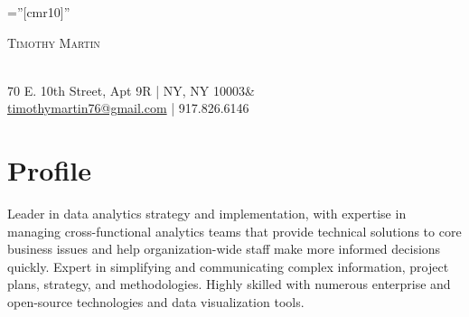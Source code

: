 \documentclass[a4paper,10pt]{article}
\begin{document}
\pagestyle{empty} %
\font\fb=''[cmr10]'' %


\par{\centering
		{\huge\textsc{Timothy} \textsc{Martin}
	}\par}
	
	\par{\centering
		{\footnotesize\\{70 E. 10th Street, Apt 9R | NY, NY 10003}& \\\href{mailto:timothymartin76@gmail.com}{timothymartin76@gmail.com} | 917.826.6146
	}\par}



\section{Profile}
\small {Leader in data analytics strategy and implementation, with expertise in managing cross-functional analytics teams that provide technical solutions to core business issues and help organization-wide staff make more informed decisions quickly. Expert in simplifying and communicating complex information, project plans, strategy, and methodologies. Highly skilled with numerous enterprise and open-source technologies and data visualization tools.
} 
\end{document}
